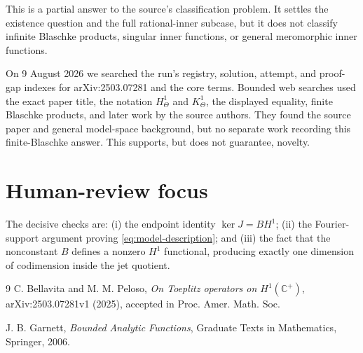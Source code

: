 \documentclass[11pt]{article}
\begin{document}
This is a partial answer to the source's classification problem.  It settles
the existence question and the full rational-inner subcase, but it does not
classify infinite Blaschke products, singular inner functions, or general
meromorphic inner functions.

On 9 August 2026 we searched the run's registry, solution, attempt, and
proof-gap indexes for arXiv:2503.07281 and the core terms.  Bounded web searches
used the exact paper title, the notation $H^1_\Theta$ and $K^1_\Theta$, the
displayed equality, finite Blaschke products, and later work by the source
authors.  They found the source paper and general model-space background, but
no separate work recording this finite-Blaschke answer.  This supports, but
does not guarantee, novelty.

\section*{Human-review focus}

The decisive checks are: (i) the endpoint identity
$\ker J=BH^1$; (ii) the Fourier-support argument proving
\eqref{eq:model-description}; and (iii) the fact that the nonconstant $B$
defines a nonzero $H^1$ functional, producing exactly one dimension of
codimension inside the jet quotient.

\begin{thebibliography}{9}
C. Bellavita and M. M. Peloso,
\emph{On Toeplitz operators on $H^1(\mathbb C^+)$},
arXiv:2503.07281v1 (2025), accepted in Proc. Amer. Math. Soc.

J. B. Garnett,
\emph{Bounded Analytic Functions},
Graduate Texts in Mathematics, Springer, 2006.
\end{thebibliography}
\end{document}
